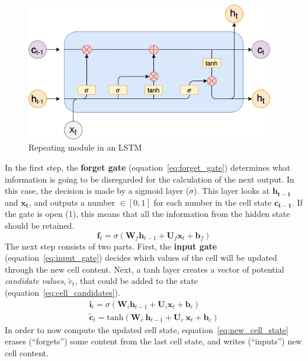 \begin{figure}
  	\includegraphics[height=6cm]{drawings/lstm}
  	\caption{Repeating module in an LSTM}
	\label{fig:lstm_architecture}
\end{figure}

In the first step, the \textbf{forget gate} (equation~\ref{eq:forget_gate}) determines what information is going to be disregarded for the calculation of the next output. In this case, the decision is made by a sigmoid layer ($ \sigma $). This layer looks at $ \boldsymbol{h_{t-1}} $ and $ \boldsymbol{x_t} $, and outputs a number $ \in [0, 1] $ for each number in the cell state $ \boldsymbol{c_{t-1}} $. If the gate is open (1), this means that all the information from the hidden state should be retained.
\begin{equation}
	\label{eq:forget_gate}
	\boldsymbol{f}_t = \sigma \left( \boldsymbol{W}_f \boldsymbol{h}_{t-1} + \boldsymbol{U}_f \boldsymbol{x}_t + \boldsymbol{b}_f \right)
\end{equation}
The next step consists of two parts. First, the \textbf{input gate} (equation~\ref{eq:input_gate}) decides which values of the cell will be updated through the new cell content. Next, a tanh layer creates a vector of potential \textit{candidate values}, $ \widetilde{c}_t $, that could be added to the state (equation~\ref{eq:cell_candidates}).
\begin{align}
	\boldsymbol{i}_t = \sigma \left( \boldsymbol{W}_i \boldsymbol{h}_{t-1} + \boldsymbol{U}_i \boldsymbol{x}_t + \boldsymbol{b}_i \right) \label{eq:input_gate} \\
	\widetilde{\boldsymbol{c}}_t = \text{tanh} \left( \boldsymbol{W}_c \ \boldsymbol{h}_{t-1} + \boldsymbol{U}_c \ \boldsymbol{x}_t + \boldsymbol{b}_c \right) \label{eq:cell_candidates}
\end{align}
In order to now compute the updated cell state, equation~\ref{eq:new_cell_state} erases (``forgets'') some content from the last cell state, and writes (``inputs'') new cell content.
